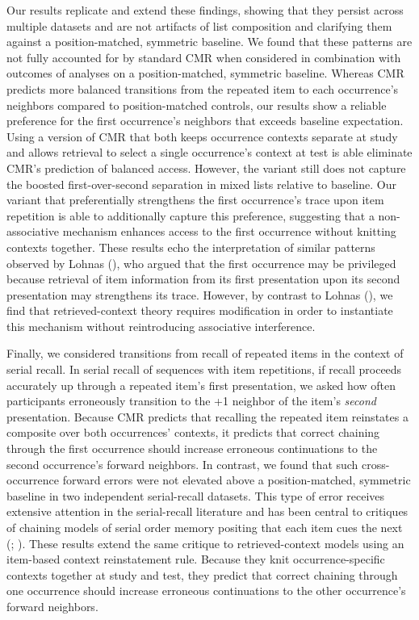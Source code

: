 \documentclass[
  man,
  floatsintext,
  longtable,
  nolmodern,
  notxfonts,
  notimes,
  draftfirst,
  colorlinks=true,linkcolor=blue,citecolor=blue,urlcolor=blue]{apa7}
\begin{document}
Our results replicate and extend these findings, showing that they
persist across multiple datasets and are not artifacts of list
composition and clarifying them against a position-matched, symmetric
baseline. We found that these patterns are not fully accounted for by
standard CMR when considered in combination with outcomes of analyses on
a position-matched, symmetric baseline. Whereas CMR predicts more
balanced transitions from the repeated item to each occurrence's
neighbors compared to position-matched controls, our results show a
reliable preference for the first occurrence's neighbors that exceeds
baseline expectation. Using a version of CMR that both keeps occurrence
contexts separate at study and allows retrieval to select a single
occurrence's context at test is able eliminate CMR's prediction of
balanced access. However, the variant still does not capture the boosted
first-over-second separation in mixed lists relative to baseline. Our
variant that preferentially strengthens the first occurrence's trace
upon item repetition is able to additionally capture this preference,
suggesting that a non-associative mechanism enhances access to the first
occurrence without knitting contexts together. These results echo the
interpretation of similar patterns observed by Lohnas
(), who argued that the first
occurrence may be privileged because retrieval of item information from
its first presentation upon its second presentation may strengthens its
trace. However, by contrast to Lohnas
(), we find that
retrieved-context theory requires modification in order to instantiate
this mechanism without reintroducing associative interference.

Finally, we considered transitions from recall of repeated items in the
context of serial recall. In serial recall of sequences with item
repetitions, if recall proceeds accurately up through a repeated item's
first presentation, we asked how often participants erroneously
transition to the +1 neighbor of the item's \emph{second} presentation.
Because CMR predicts that recalling the repeated item reinstates a
composite over both occurrences' contexts, it predicts that correct
chaining through the first occurrence should increase erroneous
continuations to the second occurrence's forward neighbors. In contrast,
we found that such cross-occurrence forward errors were not elevated
above a position-matched, symmetric baseline in two independent
serial-recall datasets. This type of error receives extensive attention
in the serial-recall literature and has been central to critiques of
chaining models of serial order memory positing that each item cues the
next (;
). These
results extend the same critique to retrieved-context models using an
item-based context reinstatement rule. Because they knit
occurrence-specific contexts together at study and test, they predict
that correct chaining through one occurrence should increase erroneous
continuations to the other occurrence's forward neighbors.
\end{document}
